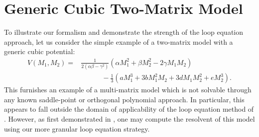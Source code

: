 \section{Generic Cubic Two-Matrix Model}
To illustrate our formalism and demonstrate the strength of the loop equation approach, let us
consider the simple example of a two-matrix model with a generic cubic potential:
%
\begin{align}
    \label{2MMGeneric}
    V(M_1,M_2) = & \frac{1}{2(\alpha \beta - \gamma^2)}(\alpha M_1^2 + \beta M_2^2 - 2 \gamma M_1 M_2) \\
                 & \qquad \quad \nonumber - \frac{1}{3} (a M_1^3 + 3b M_1^2 M_2 + 3d M_1 M_2^2 + e M_2^3).
\end{align}
%
This furnishes an example of a multi-matrix model which is not solvable through any known
saddle-point or orthogonal polynomial approach. In particular, this appears to fall outside the domain of applicability of the loop equation method of \cite{Eynard:2002kg}. However, as first demonstrated in
\cite{Carroll:1995nj}, one may compute the resolvent of this model using our more granular loop
equation strategy.

